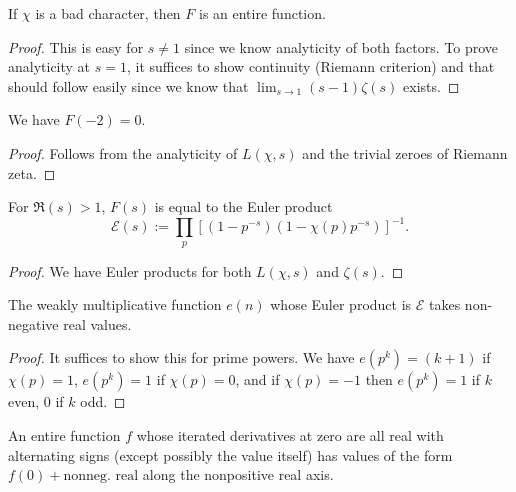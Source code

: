 \begin{lemma} \label{F_entire}
  \leanok
  If $\chi$ is a bad character, then $F$ is an entire function.
\end{lemma}

\begin{proof}
  This is easy for $s \ne 1$ since we know analyticity of both factors. To prove analyticity at $s = 1$, it suffices to show continuity (Riemann criterion) and that should follow easily since we know that $\lim_{s \to 1} (s - 1) \zeta(s)$ exists.
\end{proof}

\begin{lemma} \label{zero_of_F}
  We have $F(-2) = 0$.
\end{lemma}

\begin{proof}
  Follows from the analyticity of $L(\chi, s)$ and the trivial zeroes of Riemann zeta.
\end{proof}

\begin{lemma} \label{F_Euler_product}
  For $\Re(s) > 1$, $F(s)$ is equal to the Euler product
  \[ \mathcal{E}(s) := \prod_p \left[ (1 - p^{-s}) (1 - \chi(p) p^{-s})\right]^{-1}. \]
\end{lemma}

\begin{proof}
  We have Euler products for both $L(\chi, s)$ and $\zeta(s)$.
\end{proof}

\begin{lemma} \label{nonneg_coeffs}
  The weakly multiplicative function $e(n)$ whose Euler product is $\mathcal{E}$ takes non-negative real values.
\end{lemma}

\begin{proof}
  It suffices to show this for prime powers. We have $e(p^k) = (k + 1)$ if $\chi(p) = 1$, $e(p^k) = 1$ if $\chi(p) = 0$, and if $\chi(p) = -1$ then $e(p^k) = 1$ if $k$ even, $0$ if $k$ odd.
\end{proof}

\begin{lemma} \label{positivity_from_derivs}
  \leanok
  An entire function $f$ whose iterated derivatives at zero are all real with alternating signs
  (except possibly the value itself) has values of the form $f(0) + \text{nonneg. real}$
  along the nonpositive real axis.
\end{lemma}


